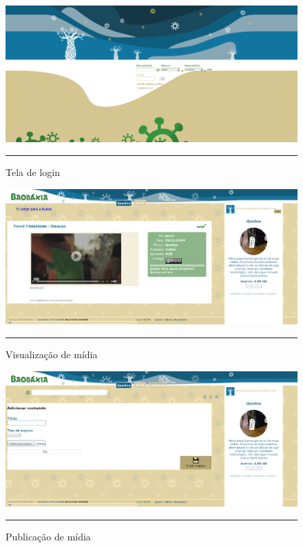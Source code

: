 \begin{figure}[htbp]
  \centering
  \includegraphics[width=\textwidth]{./Fig/InterfaceBaobaxia-login.pdf}
  \rule{35em}{0.5pt}
  \caption[Tela de login]{Tela de login}
  \label{fig:InterfaceBaobaxia-login}
\end{figure}

\begin{figure}[htbp]
  \centering
  \includegraphics[width=\textwidth]{./Fig/InterfaceBaobaxia-media-view.pdf}
  \rule{35em}{0.5pt}
  \caption[Visualização de mídia]{Visualização de mídia}
  \label{fig:InterfaceBaobaxia-media-view}
\end{figure}

\begin{figure}[htbp]
  \centering
  \includegraphics[width=\textwidth]{./Fig/InterfaceBaobaxia-media-publish.pdf}
  \rule{35em}{0.5pt}
  \caption[Publicação de mídia]{Publicação de mídia}
  \label{fig:InterfaceBaobaxia-media-publish}
\end{figure}

